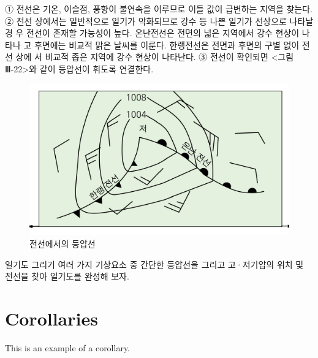 ① 전선은 기온, 이슬점, 풍향이 불연속을 이루므로 이들 값이 급변하는 지역을 찾는다.
② 전선 상에서는 일반적으로 일기가 악화되므로 강수 등 나쁜 일기가 선상으로 나타날 경
우 전선이 존재할 가능성이 높다. 온난전선은 전면의 넓은 지역에서 강수 현상이 나타나
고 후면에는 비교적 맑은 날씨를 이룬다. 한랭전선은 전면과 후면의 구별 없이 전선 상에
서 비교적 좁은 지역에 강수 현상이 나타난다.
③ 전선이 확인되면 <그림 Ⅲ-22>와 같이 등압선이 휘도록 연결한다.

\begin{figure}
	\centering
	\includegraphics[width=0.8\linewidth]{Pictures/draw-weathermap02}
	\caption{전선에서의 등압선}
	\label{fig:draw-weathermap02}
\end{figure}



일기도 그리기
여러 가지 기상요소 중 간단한 등압선을 그리고 고·저기압의 위치 및 전선을 찾아 일기도를 완성해 보자.




\section{Corollaries}

This is an example of a corollary.

